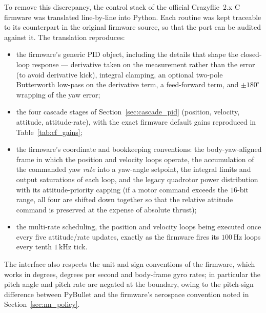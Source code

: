 \documentclass[11pt,a4paper]{article}
\theoremstyle{remark}
\numberwithin{equation}{section}
\begin{document}
To remove this discrepancy, the control stack of the official Crazyflie~2.x C
firmware was translated line-by-line into Python. Each routine was kept traceable
to its counterpart in the original firmware source, so that the port can be
audited against it. The translation reproduces:
\begin{itemize}
    \item the firmware's generic PID object, including the details that
    shape the closed-loop response --- derivative taken on the measurement rather
    than the error (to avoid derivative kick), integral clamping, an optional
    two-pole Butterworth low-pass on the derivative term, a feed-forward term, and
    $\pm 180^\circ$ wrapping of the yaw error;
    \item the four cascade stages of Section~\ref{sec:cascade_pid} (position,
    velocity, attitude, attitude-rate), with the exact firmware default gains
    reproduced in Table~\ref{tab:cf_gains};
    \item the firmware's coordinate and bookkeeping conventions: the
    body-yaw-aligned frame in which the position and velocity loops operate, the
    accumulation of the commanded yaw \emph{rate} into a yaw-angle setpoint, the
    integral limits and output saturations of each loop, and the legacy
    quadrotor power distribution with its attitude-priority capping (if a motor
    command exceeds the $16$-bit range, all four are shifted down together so that
    the relative attitude command is preserved at the expense of absolute
    thrust);
    \item the multi-rate scheduling, the position and velocity loops being
    executed once every five attitude/rate updates, exactly as the firmware fires
    its $100\,\mathrm{Hz}$ loops every tenth $1\,\mathrm{kHz}$ tick.
\end{itemize}
The interface also respects the unit and sign conventions of the firmware, which
works in degrees, degrees per second and body-frame gyro rates; in particular the
pitch angle and pitch rate are negated at the boundary, owing to the pitch-sign
difference between PyBullet and the firmware's aerospace convention noted in
Section~\ref{sec:nn_policy}.
\end{document}
